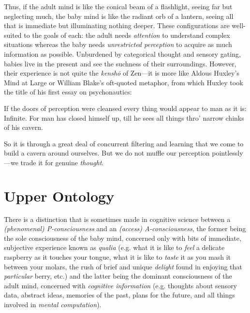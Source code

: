 Thus, if the adult mind is like the conical beam of a flashlight, seeing far but neglecting much, the baby mind is like the radiant orb of a lantern, seeing all that is immediate but illuminating nothing deeper. These configurations are well-suited to the goals of each: the adult needs \textit{attention} to understand complex situations whereas the baby needs \textit{unrestricted perception} to acquire as much information as possible. Unburdened by categorical thought and sensory gating, babies live in the present and see the suchness of their surroundings. However, their experience is not quite the \textit{kensh\=o} of Zen---it is more like Aldous Huxley's Mind at Large or William Blake's oft-quoted metaphor, from which Huxley took the title of his first essay on psychonautics: \\

\begin{displayquote}
    If the doors of perception were cleansed every thing would appear to man as it is: Infinite. For man has closed himself up, till he sees all things thro' narrow chinks of his cavern. \\
\end{displayquote}

So it is through a great deal of concurrent filtering and learning that we come to build a cavern around ourselves. But we do not muffle our perception pointlessly---we trade it for genuine \textit{thought}. \\

\section{Upper Ontology}

There is a distinction that is sometimes made in cognitive science between a \textit{(phenomenal) P-consciousness} and an \textit{(access) A-consciousness}, the former being the sole consciousness of the baby mind, concerned only with bits of immediate, subjective experience known as \textit{qualia} (e.g. what it is like to \textit{feel} a delicate raspberry as it touches your tongue, what it is like to \textit{taste} it as you mash it between your molars, the rush of brief and unique \textit{delight} found in enjoying that \textit{particular} berry, etc.) and the latter being the dominant consciousness of the adult mind, concerned with \textit{cognitive information} (e.g. thoughts about sensory data, abstract ideas, memories of the past, plans for the future, and all things involved in \textit{mental computation}). \\

